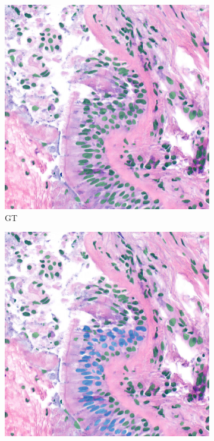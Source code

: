 \begin{figure}[H]
    \centering
    \begin{subfigure}[b]{0.3\textwidth}
    \includegraphics[width=\textwidth]{imgs/qual/lung/cilio-gt.overlay.png}
    \caption{GT}
  \end{subfigure}
  \begin{subfigure}[b]{0.3\textwidth}
    \includegraphics[width=\textwidth]{imgs/qual/lung/cilio-hov.png}

\end{subfigure}
\end{figure}
